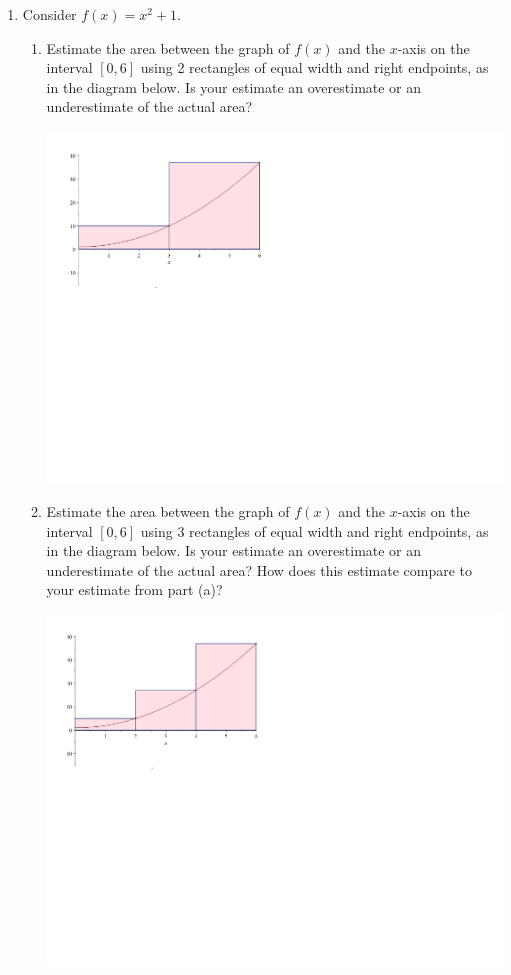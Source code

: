 \documentclass[12pt]{article}
\newif\ifans
\begin{document}
\begin{enumerate}
\item Consider $f(x)=x^2+1$.

\begin{enumerate}

\item Estimate the area between the graph of $f(x)$ and the $x$-axis on the interval $[0,6]$ using 2 rectangles of equal width and right endpoints, as in the diagram below.  Is your estimate an overestimate or an underestimate of the actual area?

\begin{center}
\includegraphics[scale=0.5]{2rect.pdf}
\end{center}

\ifans{\fbox{$A\approx 141$; This is an overestimate.}} \fi

\item Estimate the area between the graph of $f(x)$ and the $x$-axis on the interval $[0,6]$ using 3 rectangles of equal width and right endpoints, as in the diagram below.  Is your estimate an overestimate or an underestimate of the actual area?  How does this estimate compare to your estimate from part (a)?

\begin{center}
\includegraphics[scale=0.5]{3rect.pdf}
\end{center}


\end{enumerate}
\end{enumerate}
\end{document}
